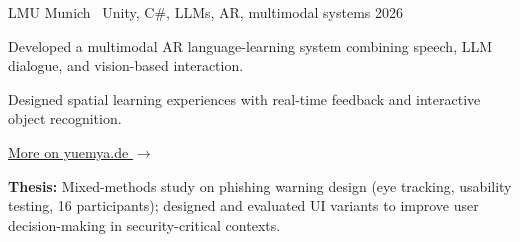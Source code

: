 \documentclass[10pt]{article}
\begin{document}
%
  {LMU Munich \textbullet\ Unity, C\#, LLMs, AR, multimodal systems}%
  {2026}
\begin{cvitems}
  \item Developed a multimodal AR language-learning system combining speech,
        LLM dialogue, and vision-based interaction.
  \item Designed spatial learning experiences with real-time feedback and
        interactive object recognition.
\end{cvitems}

\vspace{0.3em}
\href{https://yuemya.de}{\textcolor{accent}{More on yuemya.de $\rightarrow$}}



\begin{cvitems}
  \item \textbf{Thesis:} Mixed-methods study on phishing warning design
        (eye tracking, usability testing, 16 participants); designed and
        evaluated UI variants to improve user decision-making in
        security-critical contexts.
\end{cvitems}


%
\end{document}
